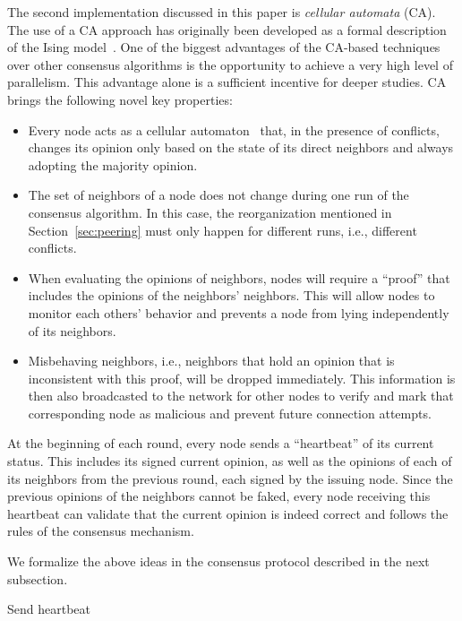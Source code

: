 \documentclass[../main.tex]{subfiles}
\begin{document}
\label{s_cellular}
The second implementation discussed in this paper is \textit{cellular automata} (CA). The use of a CA approach has originally been developed as a formal description of the Ising model~\cite{ising1925}.
One of the biggest advantages of the CA-based techniques over other consensus algorithms is the opportunity to achieve a very high level of parallelism.
This advantage alone is a sufficient incentive for deeper studies. CA brings the following novel key properties:
\begin{itemize}
    \item Every node acts as a cellular automaton~\cite{codd1968} that, in the presence of conflicts, changes its opinion only based on the state of its direct neighbors and always adopting the majority opinion. 
    \item The set of neighbors of a node does not change during one run of the consensus algorithm.
    In this case, the reorganization mentioned in Section~\ref{sec:peering} must only happen for different runs, i.e., different conflicts.
    \item When evaluating the opinions of neighbors, nodes will require a “proof” that includes the opinions of the neighbors' neighbors. This will allow nodes to monitor each others' behavior and prevents a node from lying independently of its neighbors.
    \item Misbehaving neighbors, i.e., neighbors that hold an opinion that is inconsistent with this proof, will be dropped immediately.
    This information is then also broadcasted to the network for other nodes to verify and mark that corresponding node as malicious and prevent future connection attempts.
\end{itemize}

At the beginning of each round, every node sends a ``heartbeat'' of its current status. 
This includes its signed current opinion, as well as the opinions of each of its neighbors from the previous round, each signed by the issuing node.
Since the previous opinions of the neighbors cannot be faked, every node receiving this heartbeat can validate that the current opinion is indeed correct and follows the rules of the consensus mechanism.

We formalize the above ideas in the consensus protocol described in the next subsection.


\begin{algorithm}[h]
	\DontPrintSemicolon
			
	\caption{Send heartbeat}
	\label{alg:heartbeat}
\end{algorithm}
\end{document}

